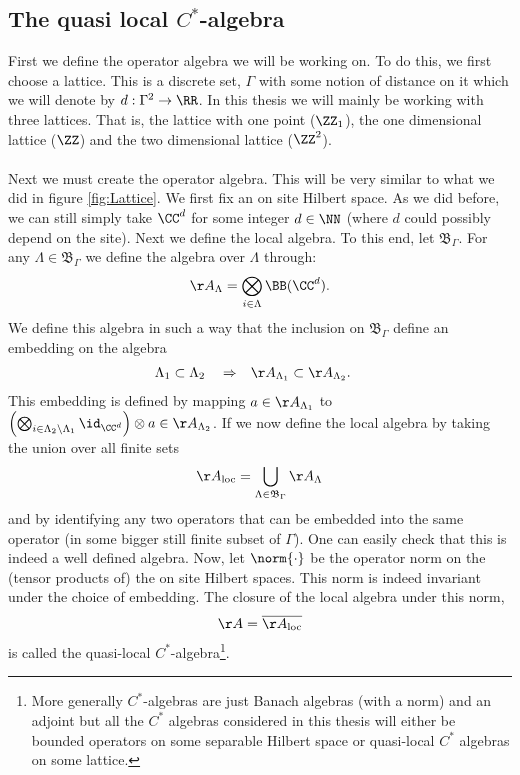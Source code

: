 \subsection{The quasi local $C^*$-algebra}
First we define the operator algebra we will be working on. To do this, we first choose a lattice. This is a discrete set, $\Gamma$ with some notion of distance on it which we will denote by $d:\Gamma^2\rightarrow \RR$. In this thesis we will mainly be working with three lattices. That is, the lattice with one point ($\ZZ_1$), the one dimensional lattice ($\ZZ$) and the two dimensional lattice ($\ZZ^2$).\\\\
Next we must create the operator algebra. This will be very similar to what we did in figure \ref{fig:Lattice}. We first fix an on site Hilbert space. As we did before, we can still simply take $\CC^d$ for some integer $d\in\NN$ (where $d$ could possibly depend on the site). Next we define the local algebra. To this end, let $\mathfrak{B}_{\Gamma}$. For any $\Lambda\in\mathfrak{B}_\Gamma$ we define the algebra over $\Lambda$ through:
\begin{equation}
\AA_{\Lambda}=\bigotimes_{i\in\Lambda}\BB(\CC^d).
\end{equation}
We define this algebra in such a way that the inclusion on $\mathfrak{B}_\Gamma$ define an embedding on the algebra
\begin{align}
\Lambda_1&\subset\Lambda_2&&\Rightarrow&\AA_{\Lambda_1}&\subset\AA_{\Lambda_2}.
\end{align}
This embedding is defined by mapping $a\in\AA_{\Lambda_1}$ to $\left(\bigotimes_{i\in\Lambda_2\backslash\Lambda_1}\id_{\CC^d}\right)\otimes a\in \AA_{\Lambda_2}$. If we now define the local algebra by taking the union over all finite sets
\begin{equation}
\AA_{\text{loc}}=\bigcup_{\Lambda\in\mathfrak{B}_\Gamma}\AA_\Lambda
\end{equation}
and by identifying any two operators that can be embedded into the same operator (in some bigger still finite subset of $\Gamma$). One can easily check that this is indeed a well defined algebra. Now, let $\norm{\cdot}$ be the operator norm on the (tensor products of) the on site Hilbert spaces. This norm is indeed invariant under the choice of embedding. The closure of the local algebra under this norm,
\begin{equation}
\AA=\overline{\AA_{\text{loc}}}
\end{equation}
is called the quasi-local $C^*$-algebra\footnote{More generally $C^*$-algebras are just Banach algebras (with a norm) and an adjoint but all the $C^*$ algebras considered in this thesis will either be bounded operators on some separable Hilbert space or quasi-local $C^*$ algebras on some lattice.}.

